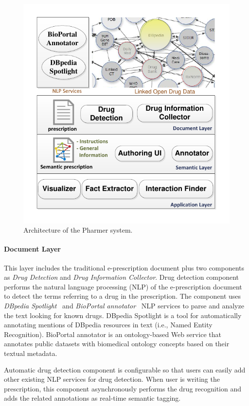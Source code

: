\documentclass[journal]{IEEEtran}
\begin{document}
\begin{figure}[tb]
	\centering
		\includegraphics[width=1\columnwidth]{images/architecture.pdf}
	\caption{Architecture of the Pharmer system.}
	\label{fig:arch}
\end{figure}

\paragraph{Document Layer} This layer includes the traditional e-prescription document plus two components as \emph{Drug Detection} and \emph{Drug Information Collector}.
Drug detection component performs the natural language processing (NLP) of the e-prescription document to detect the terms referring to a drug in the prescription.
The component uses \emph{DBpedia Spotlight}~\cite{dbspotlight} and \emph{BioPortal annotator}~\cite{bioportal} NLP services to parse and analyze the text looking for known drugs.
DBpedia Spotlight is a tool for automatically annotating mentions of DBpedia resources in text (i.e., Named Entity Recognition).
BioPortal annotator is an ontology-based Web service that annotates public datasets with biomedical ontology concepts based on their textual metadata.

Automatic drug detection component is configurable so that users can easily add other existing NLP services for drug detection.
When user is writing the prescription, this component asynchronously performs the drug recognition and adds the related annotations as real-time semantic tagging.
\end{document}
